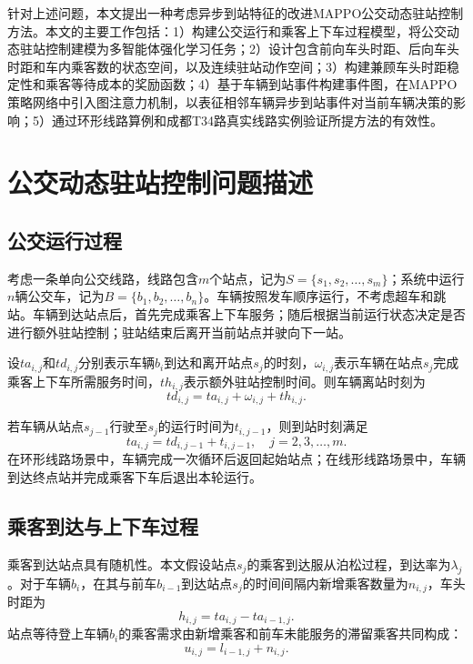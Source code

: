 \documentclass[UTF8,zihao=-4,fontset=none]{ctexart}
\begin{document}
针对上述问题，本文提出一种考虑异步到站特征的改进MAPPO公交动态驻站控制方法。本文的主要工作包括：1）构建公交运行和乘客上下车过程模型，将公交动态驻站控制建模为多智能体强化学习任务；2）设计包含前向车头时距、后向车头时距和车内乘客数的状态空间，以及连续驻站动作空间；3）构建兼顾车头时距稳定性和乘客等待成本的奖励函数；4）基于车辆到站事件构建事件图，在MAPPO策略网络中引入图注意力机制，以表征相邻车辆异步到站事件对当前车辆决策的影响；5）通过环形线路算例和成都T34路真实线路实例验证所提方法的有效性。

\section{公交动态驻站控制问题描述}

\subsection{公交运行过程}

考虑一条单向公交线路，线路包含$m$个站点，记为$S=\{s_1,s_2,\ldots,s_m\}$；系统中运行$n$辆公交车，记为$B=\{b_1,b_2,\ldots,b_n\}$。车辆按照发车顺序运行，不考虑超车和跳站。车辆到达站点后，首先完成乘客上下车服务；随后根据当前运行状态决定是否进行额外驻站控制；驻站结束后离开当前站点并驶向下一站。

设$ta_{i,j}$和$td_{i,j}$分别表示车辆$b_i$到达和离开站点$s_j$的时刻，$\omega_{i,j}$表示车辆在站点$s_j$完成乘客上下车所需服务时间，$th_{i,j}$表示额外驻站控制时间。则车辆离站时刻为
\begin{equation}
td_{i,j}=ta_{i,j}+\omega_{i,j}+th_{i,j}.
\end{equation}

若车辆从站点$s_{j-1}$行驶至$s_j$的运行时间为$t_{i,j-1}$，则到站时刻满足
\begin{equation}
ta_{i,j}=td_{i,j-1}+t_{i,j-1}, \quad j=2,3,\ldots,m.
\end{equation}
在环形线路场景中，车辆完成一次循环后返回起始站点；在线形线路场景中，车辆到达终点站并完成乘客下车后退出本轮运行。

\subsection{乘客到达与上下车过程}

乘客到达站点具有随机性。本文假设站点$s_j$的乘客到达服从泊松过程，到达率为$\lambda_j$。对于车辆$b_i$，在其与前车$b_{i-1}$到达站点$s_j$的时间间隔内新增乘客数量为$n_{i,j}$，车头时距为
\begin{equation}
h_{i,j}=ta_{i,j}-ta_{i-1,j}.
\end{equation}
站点等待登上车辆$b_i$的乘客需求由新增乘客和前车未能服务的滞留乘客共同构成：
\begin{equation}
u_{i,j}=l_{i-1,j}+n_{i,j}.
\end{equation}
\end{document}
